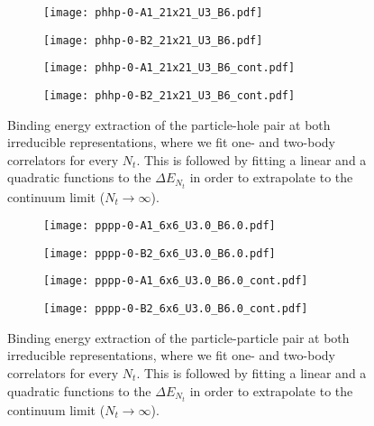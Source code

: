 \begin{figure}
  \begin{subfigure}{.5\textwidth}
    \centering
    \texttt{[image: phhp-0-A1\_21x21\_U3\_B6.pdf]}
  \end{subfigure}%
  \begin{subfigure}{.5\textwidth}
    \centering
    \texttt{[image: phhp-0-B2\_21x21\_U3\_B6.pdf]}
  \end{subfigure}
  \begin{subfigure}{.5\textwidth}
      \centering
      \texttt{[image: phhp-0-A1\_21x21\_U3\_B6\_cont.pdf]}
  \end{subfigure}
  \begin{subfigure}{.5\textwidth}
      \centering
      \texttt{[image: phhp-0-B2\_21x21\_U3\_B6\_cont.pdf]}
  \end{subfigure}
  \caption{Binding energy extraction of the particle-hole pair at both irreducible representations, where we fit one- and two-body correlators for every $N_t$. This is followed by fitting a linear and a quadratic functions to the $\Delta E_{N_t}$ in order to extrapolate to the continuum limit ($N_t\to\infty$).}
  \label{fig:fig5}
\end{figure}

\begin{figure}
  \begin{subfigure}{.5\textwidth}
    \centering
    \texttt{[image: pppp-0-A1\_6x6\_U3.0\_B6.0.pdf]}
  \end{subfigure}%
  \begin{subfigure}{.5\textwidth}
    \centering
    \texttt{[image: pppp-0-B2\_6x6\_U3.0\_B6.0.pdf]}
  \end{subfigure}
  \begin{subfigure}{.5\textwidth}
      \centering
      \texttt{[image: pppp-0-A1\_6x6\_U3.0\_B6.0\_cont.pdf]}
  \end{subfigure}
  \begin{subfigure}{.5\textwidth}
      \centering
      \texttt{[image: pppp-0-B2\_6x6\_U3.0\_B6.0\_cont.pdf]}
  \end{subfigure}
  \caption{Binding energy extraction of the particle-particle pair at both irreducible representations, where we fit one- and two-body correlators for every $N_t$. This is followed by fitting a linear and a quadratic functions to the $\Delta E_{N_t}$ in order to extrapolate to the continuum limit ($N_t\to\infty$).}
  \label{fig:fig6}
\end{figure}

